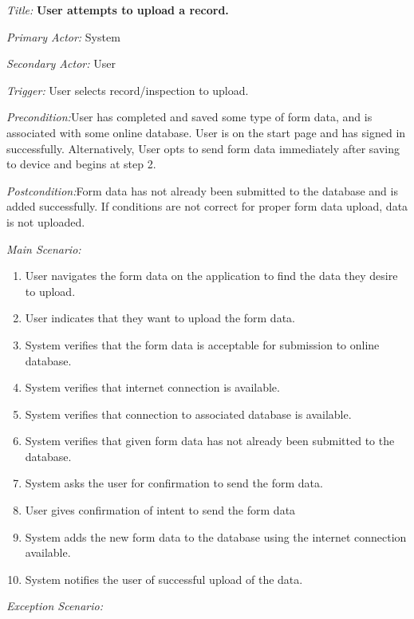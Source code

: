\documentclass[twoside,letterpaper]{article}
\begin{document}
\textit{Title: }{\bfseries\color{black}User attempts to upload a record.}

{\color{black} \textit{Primary Actor:} System}

{\color{black} \textit{Secondary Actor:} User}

{\color{black} \textit{Trigger:} User selects record/inspection to upload.}

{\color{black} \textit{Precondition:}User has completed and saved some type of form data, and is associated with some online database. User is on the start page and has signed in successfully. Alternatively, User opts to send form data immediately after saving to device and begins at step 2.}

{\color{black} \textit{Postcondition:}Form data has not already been submitted to the database and is added successfully. If conditions are not correct for proper form data upload, data is not uploaded.}
\newline

{\color{black} \textit{Main Scenario:}}
\begin{enumerate}
\item User navigates the form data on the application to find the data they desire to upload.
\item User indicates that they want to upload the form data.
\item System verifies that the form data is acceptable for submission to online database.
\item System verifies that internet connection is available.
\item System verifies that connection to associated database is available.
\item System verifies that given form data has not already been submitted to the database.
\item System asks the user for confirmation to send the form data.
\item User gives confirmation of intent to send the form data
\item System adds the new form data to the database using the internet connection available.
\item System notifies the user of successful upload of the data.
\end{enumerate}

{\color{black} \textit{Exception Scenario:}}
\end{document}
